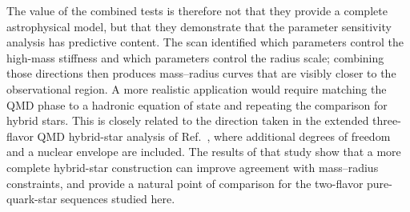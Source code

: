 The value of the combined tests is therefore not that they provide a
complete astrophysical model, but that they demonstrate that the
parameter sensitivity analysis has predictive content. The scan
identified which parameters control the high-mass stiffness and which
parameters control the radius scale; combining those directions then
produces mass--radius curves that are visibly closer to the observational
region. A more realistic application would require matching the QMD phase
to a hadronic equation of state and repeating the comparison for hybrid
stars. This is closely related to the direction taken in the extended three-flavor
QMD hybrid-star analysis of Ref.~\cite{Andersen2026}, where additional degrees
of freedom and a nuclear envelope are included. The results of that study show
that a more complete hybrid-star construction can improve agreement with
mass--radius constraints, and provide a natural point of comparison for the
two-flavor pure-quark-star sequences studied here.
